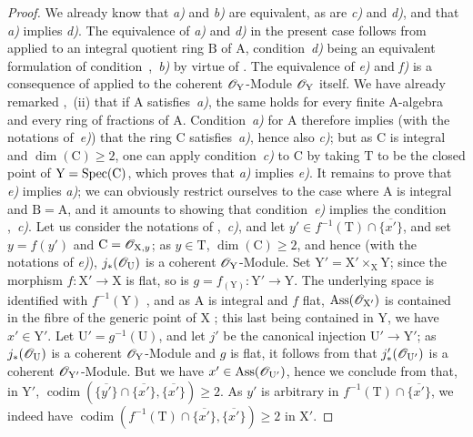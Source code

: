 \begin{proof}
We already know  that \emph{a)} and \emph{b)} are equivalent, as are \emph{c)} and \emph{d)}, and that \emph{a)} implies \emph{d)}.
The equivalence of \emph{a)} and \emph{d)} in the present case follows from  applied to an integral quotient ring $\mathrm{B}$ of $\mathrm{A}$, condition~\emph{d)} being an equivalent formulation of condition~,~\emph{b)} by virtue of .
The equivalence of \emph{e)} and \emph{f)} is a consequence of  applied to the coherent $\mathscr{O}_\mathrm{Y}$-Module $\mathscr{O}_\mathrm{Y}$ itself.
We have already remarked ,~(ii) that if $\mathrm{A}$ satisfies~\emph{a)}, the same holds for every finite A-algebra and every ring of fractions of $\mathrm{A}$.
Condition~\emph{a)} for $\mathrm{A}$ therefore implies (with the notations of~\emph{e)}) that the ring $\mathrm{C}$ satisfies~\emph{a)}, hence also \emph{c)}; but as $\mathrm{C}$ is integral and $\dim(\mathrm{C})\geqslant 2$, one can apply condition~\emph{c)} to $\mathrm{C}$ by taking $\mathrm{T}$ to be the closed point of $\mathrm{Y}=\operatorname{Spec}(\mathrm{C})$, which proves that \emph{a)} implies \emph{e)}.
It remains to prove that \emph{e)} implies \emph{a)};
we can obviously restrict ourselves to the case where $\mathrm{A}$ is integral and $\mathrm{B}=\mathrm{A}$, and it amounts to showing that condition~\emph{e)} implies the condition ,~\emph{c)}.
Let us consider the notations of ,~\emph{c)}, and let $y'\in f^{-1}(\mathrm{T})\cap\overline{\{x'\}}$, and set $y=f(y')$ and $\mathrm{C}=\mathscr{O}_{\mathrm{X},y}$; as $y\in\mathrm{T}$, $\dim(\mathrm{C})\geqslant 2$, and hence (with the notations of \emph{e)}), $j_*(\mathscr{O}_\mathrm{U})$ is a coherent $\mathscr{O}_\mathrm{Y}$-Module.
Set $\mathrm{Y}'=\mathrm{X}'\times_\mathrm{X}\mathrm{Y}$; since the morphism $f:\mathrm{X}'\to\mathrm{X}$ is flat, so is $g=f_{(\mathrm{Y})}:\mathrm{Y}'\to\mathrm{Y}$.
The underlying space is identified with $f^{-1}(\mathrm{Y})$ , and as $\mathrm{A}$ is integral and $f$ flat, $\operatorname{Ass}(\mathscr{O}_{\mathrm{X}'})$ is contained in the fibre of the generic point of $\mathrm{X}$ ; this last being contained in $\mathrm{Y}$, we have $x'\in\mathrm{Y}'$.
Let $\mathrm{U}'=g^{-1}(\mathrm{U})$, and let $j'$ be the canonical injection $\mathrm{U}'\to\mathrm{Y}'$; as $j_*(\mathscr{O}_\mathrm{U})$ is a coherent $\mathscr{O}_\mathrm{Y}$-Module and $g$ is flat, it follows from  that $j'_*(\mathscr{O}_{\mathrm{U}'})$ is a coherent $\mathscr{O}_{\mathrm{Y}'}$-Module.
But we have $x'\in\operatorname{Ass}(\mathscr{O}_{\mathrm{U}'})$, hence we conclude from  that, in $\mathrm{Y}'$,
$\operatorname{codim}(\overline{\{y'\}}\cap\overline{\{x'\}},\overline{\{x'\}})\geqslant 2$.
As $y'$ is arbitrary in $f^{-1}(\mathrm{T})\cap\overline{\{x'\}}$, we indeed have
$\operatorname{codim}(f^{-1}(\mathrm{T})\cap\overline{\{x'\}},\overline{\{x'\}})\geqslant 2$ in $\mathrm{X}'$.
\end{proof}

